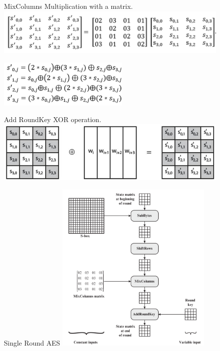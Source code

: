 \documentclass{beamer}
\begin{document}
\begin{frame}{MixColumns}
	Multiplication with a matrix.
	\centering
	\includegraphics[width=4.5in]{fig/clip_image010.png}

	\includegraphics[width=2.5in]{fig/clip_image012.png}



\end{frame}

\begin{frame}{Add RoundKey}
	\centering
	XOR operation.
	\includegraphics[width=4.5in]{fig/clip_image004.jpg}
\end{frame}

\begin{frame}{Single Round AES}
	\includegraphics[width=3.0in]{fig/singleround.png}
\end{frame}
\end{document}
